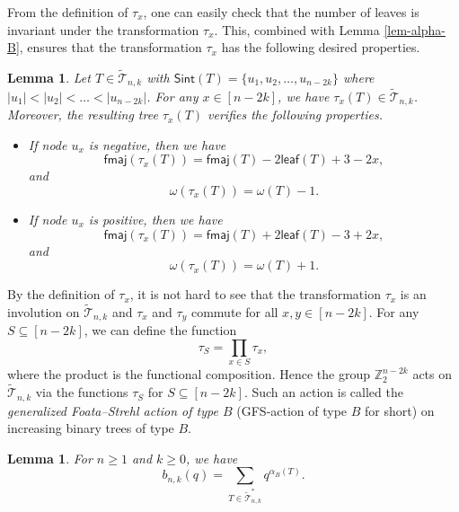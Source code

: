 \documentclass[12pt]{article}
\numberwithin{equation}{section}
\theoremstyle{plain}
\newtheorem{lemma}[theorem]{Lemma}
\def\fmaj{\mathsf{fmaj}}
\def\Sint{\mathsf{Sint}}
\def\B{\mathcal{T}}
\def\leaf{\mathsf{leaf}}
\begin{document}
	 				 From the definition of $\tau_x$,  one can easily check that the number of leaves  is invariant under the transformation  $\tau_x$.   This, combined with Lemma \ref{lem-alpha-B}, 
	 				 ensures that  the transformation  $\tau_x$  has the following desired properties. 
	 				 \begin{lemma}\label{lem-tau-prop}
	 				 		Let $T\in \widetilde{\B}_{n,k}$  with
	 				 		$\Sint(T)=\{u_1, u_2, \ldots, u_{n-2k}\}$  where  $|u_1|<|u_2|<\ldots< |u_{n-2k}|$. 
	 				 		 For any $x\in [n-2k]$,    we have $\tau_x(T)\in \widetilde{\B}_{n,k}$. Moreover,  the resulting tree $\tau_{x}(T)$ verifies the following properties.
	 				 	\begin{itemize}
	 				 	 
	 				 		
	 				 		\item  If node $u_x$ is   negative, then we have 
	 				 		$$
	 				 		\fmaj(\tau_{x}(T))=\fmaj(T)-2\leaf(T)+3-2x,
	 				 		$$
	 				 		and 
	 				 		$$
	 				 		\omega(\tau_{x}(T))=\omega(T)-1.
	 				 		$$
	 				 		
	 				 		\item  If node $u_x$ is  positive, then we have 
	 				 		$$
	 				 		\fmaj(\tau_{x}(T))=\fmaj(T)+2\leaf(T)-3+2x,
	 				 		$$
	 				 		and 
	 				 		$$
	 				 		\omega(\tau_{x}(T))=\omega(T)+1.
	 				 		$$
	 				 	\end{itemize}
	 				 	
	 				 	\end{lemma}
	 				 
	 				 By the definition of $\tau_x$,  it is not hard to see that the transformation $\tau_x$ is an involution
	 				 on $\widetilde{\B}_{n,k}$ and $\tau_x$ and $\tau_y$ commute for all $x,y\in [n-2k]$.
	 				   For any  $S\subseteq [n-2k]$,  we can define the
	 				 function \[
	 				 \tau_S=\prod_{x\in S}\tau_x,
	 				 \]
	 				 where the product is the functional composition.      Hence the group $\mathbb{Z}_2^{n-2k}$
	 				 acts on $ \widetilde{\B}_{n,k}$ via the functions $\tau_S$ for $S\subseteq [n-2k]$.
	 				 Such an action is called the {\em generalized Foata–Strehl action  of type $B$} (GFS‑action of type $B$  for short) on increasing binary trees of type $B$.
	 				 
	 				 
	 				 \begin{lemma}\label{lem-b_{n,k}}
	 				 	For $n\geq 1$ and $k\geq 0$, we have
	 				 	$$
	 				 	b_{n,k}(q)=\sum_{T\in\widetilde{\mathcal T}_{n,k}^{*}}q^{\alpha_B(T)}.
	 				 	$$
	 				 	\end{lemma}
	 				 
\end{document}
